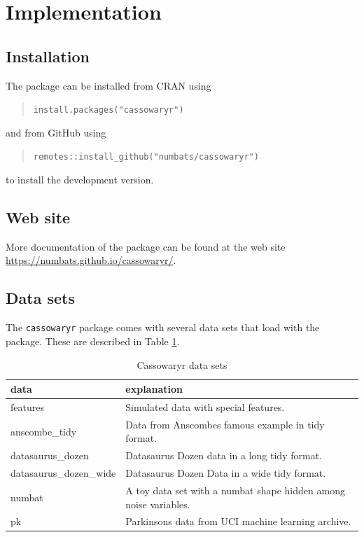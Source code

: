 \section{Implementation}\label{implementation}

\subsection{Installation}\label{installation}

The package can be installed from CRAN using

\begin{quote}
\texttt{install.packages("cassowaryr")}
\end{quote}

and from GitHub using

\begin{quote}
\texttt{remotes::install\_github("numbats/cassowaryr")}
\end{quote}

to install the development version.

\subsection{Web site}\label{web-site}

More documentation of the package can be found at the web site \url{https://numbats.github.io/cassowaryr/}.

\subsection{Data sets}\label{data-sets}

The \texttt{cassowaryr} package comes with several data sets that load with the package. These are described in Table \ref{tab:datasets-tb-pdf}.

\begin{table}

\caption{\label{tab:datasets-tb-pdf}Cassowaryr data sets}
\centering
\begin{tabular}[t]{>{\raggedright\arraybackslash}p{4cm}>{\raggedright\arraybackslash}p{8cm}}
\toprule
data & explanation\\
\midrule
features & Simulated data with special features.\\
anscombe\_tidy & Data from Anscombes famous example in tidy format.\\
datasaurus\_dozen & Datasaurus Dozen data in a long tidy format.\\
datasaurus\_dozen\_wide & Datasaurus Dozen Data in a wide tidy format.\\
numbat & A toy data set with a numbat shape hidden among noise variables.\\
\addlinespace
pk & Parkinsons data from UCI machine learning archive.\\
\bottomrule
\end{tabular}
\end{table}

